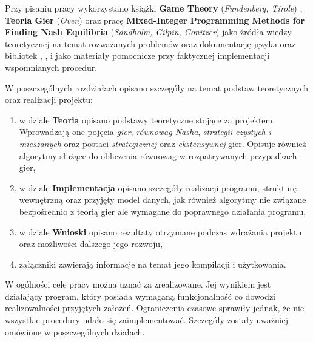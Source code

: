 \documentclass[polish]{standalone}
\begin{document}
Przy pisaniu pracy wykorzystano książki \textbf{Game Theory} (\textit{Fundenberg, Tirole}) \cite{FT-GT},
\textbf{Teoria Gier} (\textit{Oven}) \cite{O-GT} oraz pracę \textbf{Mixed-Integer Programming Methods for Finding Nash
Equilibria} (\textit{Sandholm, Gilpin, Conitzer}) \cite{SCG-NE} jako źródła wiedzy teoretycznej na temat rozważanych
problemów oraz dokumentację języka  oraz bibliotek , ,  i  jako
materiały pomocnicze przy faktycznej implementacji wspomnianych procedur.

W poszczególnych rozdziałach opisano szczegóły na temat podstaw teoretycznych oraz realizacji projektu:
\begin{enumerate}
\item w dziale \textbf{Teoria} opisano podstawy teoretyczne stojące za projektem. Wprowadzają one pojęcia \textit{gier},
\textit{równowag Nasha},
\textit{strategii czystych i mieszanych} oraz postaci \textit{strategicznej} oraz \textit{ekstensywnej} gier. Opisuje
również algorytmy służące do obliczenia równowag w rozpatrywanych przypadkach gier,
\item w dziale \textbf{Implementacja} opisano szczegóły realizacji programu, strukturę wewnętrzną oraz przyjęty model
danych, jak również algorytmy nie związane bezpośrednio z teorią gier ale wymagane do poprawnego działania programu,
\item w dziale \textbf{Wnioski} opisano rezultaty otrzymane podczas wdrażania projektu oraz możliwości dalszego jego
rozwoju,
\item załączniki zawierają informacje na temat jego kompilacji i użytkowania.
\end{enumerate}

W ogólności cele pracy można uznać za zrealizowane. Jej wynikiem jest działający program, który posiada wymaganą
funkcjonalność co dowodzi realizowalności przyjętych założeń. Ograniczenia czasowe sprawiły jednak, że nie wszystkie
procedury udało się zaimplementować. Szczegóły zostały uważniej omówione w poszczególnych działach.
\end{document}
